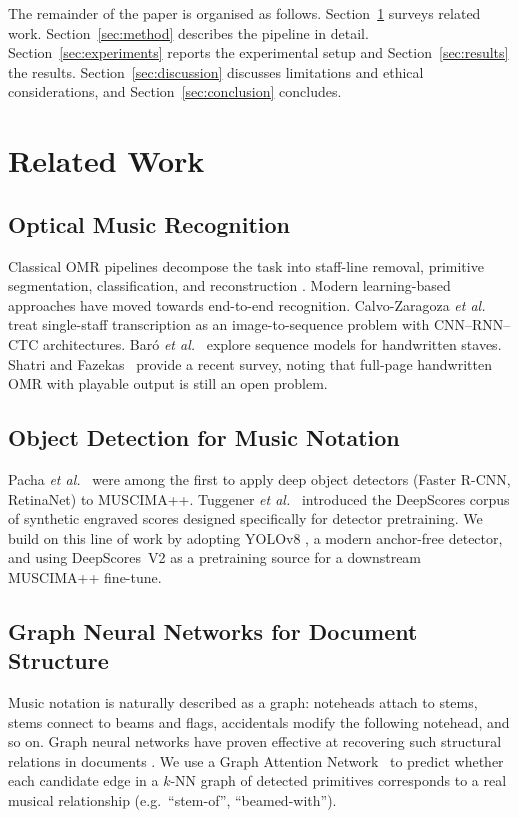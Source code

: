 \documentclass[conference]{IEEEtran}
\begin{document}
The remainder of the paper is organised as follows. Section~\ref{sec:related}
surveys related work. Section~\ref{sec:method} describes the pipeline in
detail. Section~\ref{sec:experiments} reports the experimental setup and
Section~\ref{sec:results} the results. Section~\ref{sec:discussion} discusses
limitations and ethical considerations, and Section~\ref{sec:conclusion}
concludes.

\section{Related Work}\label{sec:related}
\subsection{Optical Music Recognition}
Classical OMR pipelines decompose the task into staff-line removal, primitive
segmentation, classification, and reconstruction
\cite{rebelo2012optical,calvo2020understanding}. Modern learning-based
approaches have moved towards end-to-end recognition. Calvo-Zaragoza
\textit{et al.}~\cite{calvo2018camera} treat single-staff transcription as an
image-to-sequence problem with CNN--RNN--CTC architectures. Bar\'o
\textit{et al.}~\cite{baro2019handwritten} explore sequence models for
handwritten staves. Shatri and Fazekas~\cite{shatri2020optical} provide a
recent survey, noting that full-page handwritten OMR with playable output is
still an open problem.

\subsection{Object Detection for Music Notation}
Pacha \textit{et al.}~\cite{pacha2018handwritten} were among the first to apply
deep object detectors (Faster R-CNN, RetinaNet) to MUSCIMA++. Tuggener
\textit{et al.}~\cite{tuggener2018deepscores,tuggener2024deepscores2} introduced
the DeepScores corpus of synthetic engraved scores designed specifically for
detector pretraining. We build on this line of work by adopting YOLOv8
\cite{jocher2023yolov8}, a modern anchor-free detector, and using
DeepScores~V2 as a pretraining source for a downstream MUSCIMA++ fine-tune.

\subsection{Graph Neural Networks for Document Structure}
Music notation is naturally described as a graph: noteheads attach to stems,
stems connect to beams and flags, accidentals modify the following notehead,
and so on. Graph neural networks have proven effective at recovering such
structural relations in documents
\cite{kipf2017semi,velickovic2018graph,riba2020table}. We use a Graph
Attention Network~\cite{velickovic2018graph} to predict whether each candidate
edge in a $k$-NN graph of detected primitives corresponds to a real
musical relationship (e.g.\ ``stem-of'', ``beamed-with'').
\end{document}
